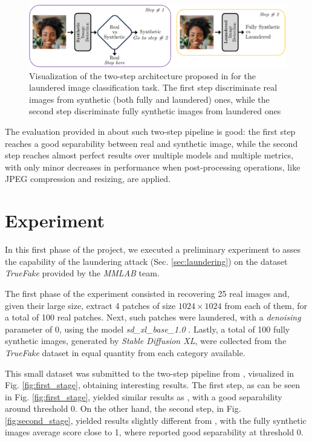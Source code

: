 \documentclass[conference]{IEEEtran} %
\begin{document}
        \begin{figure}[h]
            \centering
            \includegraphics[width=0.95\linewidth]{Img/launder_2_stage.png}
            \caption{Visualization of the two-step architecture proposed in \cite{mandelli2024synthetic} for the laundered image classification task. The first step discriminate real images from synthetic (both fully and laundered) ones, while the second step discriminate fully synthetic images from laundered ones}
            \label{fig:launder_2_stage}
        \end{figure}
        The evaluation provided in \cite{mandelli2024synthetic} about such two-step pipeline is good: the first step reaches a good separability between real and synthetic image, while the second step reaches almost perfect results over multiple models and multiple metrics, with only minor decreases in performance when post-processing operations, like JPEG compression and resizing, are applied.

\section{Experiment}
    In this first phase of the project, we executed a preliminary experiment to asses the capability of the laundering attack (Sec. \ref{sec:laundering}) on the dataset \textit{TrueFake} provided by the \textit{MMLAB} team.

    The first phase of the experiment consisted in recovering 25 real images and, given their large size, extract 4 patches of size $1024\times1024$ from each of them, for a total of 100 real patches. Next, such patches were laundered, with a \textit{denoising} parameter of 0, using the model \textit{sd\_xl\_base\_1.0} \cite{sdxl_base_1_0}. Lastly, a total of 100 fully synthetic images, generated by \textit{Stable Diffusion XL}, were collected from the \textit{TrueFake} dataset in equal quantity from each category available.

    This small dataset was submitted to the two-step pipeline from \cite{mandelli2024synthetic}, visualized in Fig. \ref{fig:first_stage}, obtaining interesting results. The first step, as can be seen in Fig. \ref{fig:first_stage}, yielded similar results as \cite{mandelli2024synthetic}, with a good separability around threshold 0. On the other hand, the second step, in Fig. \ref{fig:second_stage}, yielded results slightly different from \cite{mandelli2024synthetic}, with the fully synthetic images average score close to 1, where \cite{mandelli2024synthetic} reported good separability at threshold 0. 
\end{document}
